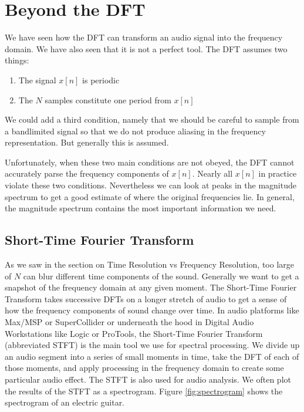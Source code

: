 \section*{Beyond the DFT}

We have seen how the DFT can transform an audio signal into the frequency domain.  We have also
seen that it is not a perfect tool.  The DFT assumes two things:

\begin{enumerate}
	\item The signal $x[n]$ is periodic
	\item The $N$ samples constitute one period from $x[n]$
\end{enumerate}

We could add a third condition, namely that we should be careful to sample from a bandlimited signal so
that we do not produce aliasing in the frequency representation.  But generally this is assumed.  

Unfortunately, when these two main conditions are not obeyed, the DFT cannot accurately parse the frequency
components of $x[n]$.  Nearly all $x[n]$ in practice violate these two conditions.  Nevertheless we can look at
peaks in the magnitude spectrum to get a good estimate of where the original frequencies lie.  In general, the
magnitude spectrum contains the most important information we need. 

\subsection*{Short-Time Fourier Transform}

As we saw in the section on Time Resolution vs Frequency Resolution, too large of $N$ can blur 
different time components of the sound.  Generally we want to get a snapshot of the frequency domain at
any given moment.
The Short-Time Fourier Transform takes successive DFTs on a longer stretch of audio to get a sense of
how the frequency components of sound change over time.  In audio platforms like Max/MSP or SuperCollider
or underneath the hood in Digital Audio Workstations like Logic or ProTools, the Short-Time Fourier Transform
(abbreviated STFT) is the main tool we use for spectral processing.  We divide up an audio segment into
a series of small moments in time, take the DFT of each of those moments, and apply processing in the 
frequency domain to create some particular audio effect.  The STFT is also used for audio analysis.  We often
plot the results of the STFT as a spectrogram.  Figure \ref{fig:spectrogram} shows the spectrogram of an electric guitar.

